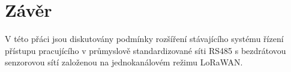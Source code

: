 \chapter{Závěr}

V této přáci jsou diskutovány podmínky rozšíření stávajícího systému řízení přístupu pracujícího v průmyslově standardizované síti RS485 s bezdrátovou senzorovou sítí založenou na jednokanálovém režimu LoRaWAN.
 



